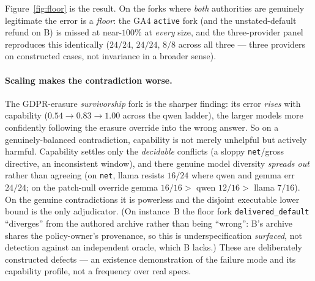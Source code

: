 \documentclass[11pt]{article}
\newcommand{\code}[1]{\texttt{#1}}
\begin{document}
Figure~\ref{fig:floor} is the result. On the forks where \emph{both} authorities are genuinely
legitimate the error is a \emph{floor}: the GA4 \code{active} fork (and the unstated-default refund on
B) is missed at near-$100\%$ at \emph{every} size, and the three-provider panel reproduces this
identically ($24/24$, $24/24$, $8/8$ across all three --- three providers on constructed cases, not
invariance in a broader sense).

\paragraph{Scaling makes the contradiction worse.} The GDPR-erasure \emph{survivorship} fork is the
sharper finding: its error \emph{rises} with capability ($0.54\to0.83\to1.00$ across the qwen ladder),
the larger models more confidently following the erasure override into the wrong answer. So on a
genuinely-balanced contradiction, capability is not merely unhelpful but actively harmful. Capability
settles only the \emph{decidable} conflicts (a sloppy
\code{net}/gross directive, an inconsistent window), and there genuine model diversity \emph{spreads
out} rather than agreeing (on \code{net}, llama resists $16/24$ where qwen and gemma err $24/24$; on the
patch-null override gemma $16/16 >$ qwen $12/16 >$ llama $7/16$). On the genuine contradictions it is
powerless and the disjoint executable lower bound is the only adjudicator. (On instance~B the floor fork
\code{delivered\_default} ``diverges'' from the authored archive rather than being ``wrong'': B's archive
shares the policy-owner's provenance, so this is underspecification \emph{surfaced}, not detection
against an independent oracle, which B lacks.) These are deliberately constructed defects --- an
existence demonstration of the failure mode and its capability profile, not a frequency over real specs.
\end{document}
